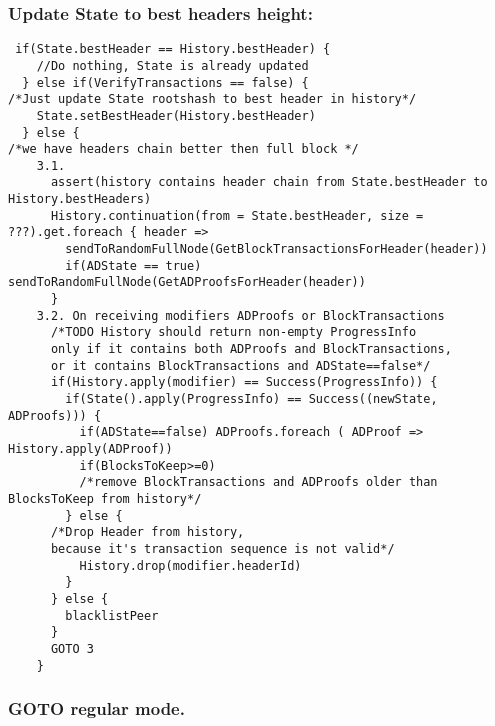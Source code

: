 \documentclass[]{report}   %
\begin{document}
\subsubsection{Update State to best headers height:}
\begin{verbatim}
 if(State.bestHeader == History.bestHeader) {
    //Do nothing, State is already updated
  } else if(VerifyTransactions == false) {
/*Just update State rootshash to best header in history*/
    State.setBestHeader(History.bestHeader)
  } else {
/*we have headers chain better then full block */        
    3.1. 
      assert(history contains header chain from State.bestHeader to History.bestHeaders)
      History.continuation(from = State.bestHeader, size = ???).get.foreach { header => 
        sendToRandomFullNode(GetBlockTransactionsForHeader(header))
        if(ADState == true) sendToRandomFullNode(GetADProofsForHeader(header))
      }
    3.2. On receiving modifiers ADProofs or BlockTransactions
      /*TODO History should return non-empty ProgressInfo
      only if it contains both ADProofs and BlockTransactions,
      or it contains BlockTransactions and ADState==false*/
      if(History.apply(modifier) == Success(ProgressInfo)) {
        if(State().apply(ProgressInfo) == Success((newState, ADProofs))) {
          if(ADState==false) ADProofs.foreach ( ADProof => History.apply(ADProof))
          if(BlocksToKeep>=0) 
          /*remove BlockTransactions and ADProofs older than BlocksToKeep from history*/
        } else {
      /*Drop Header from history, 
      because it's transaction sequence is not valid*/
          History.drop(modifier.headerId)
        }
      } else {
        blacklistPeer
      }
      GOTO 3
    }
\end{verbatim}
\subsubsection{GOTO regular mode.}
\begin{verbatim}

\end{verbatim}
\end{document}
